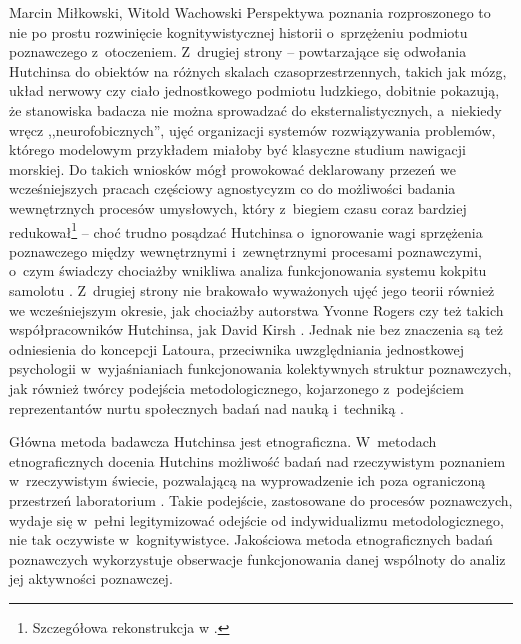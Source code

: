 \begin{artplenv2auth}{Marcin Miłkowski, Witold Wachowski}
Perspektywa poznania rozproszonego to nie po prostu rozwinięcie kognitywistycznej historii o~sprzężeniu podmiotu poznawczego z~otoczeniem. Z~drugiej strony -- powtarzające się odwołania Hutchinsa do obiektów na różnych skalach czasoprzestrzennych, takich jak mózg, układ nerwowy czy ciało jednostkowego podmiotu ludzkiego, dobitnie pokazują, że stanowiska badacza nie można sprowadzać do eksternalistycznych, a~niekiedy wręcz ,,neurofobicznych'', ujęć organizacji systemów rozwiązywania problemów, którego modelowym przykładem miałoby być klasyczne studium nawigacji morskiej. Do takich wniosków mógł prowokować deklarowany przezeń we wcześniejszych pracach częściowy agnostycyzm co do możliwości badania wewnętrznych procesów umysłowych, który z~biegiem czasu coraz bardziej redukował\footnote{Szczegółowa rekonstrukcja w
\parencites[][s.~178–188]{afeltowicz_modele_2012}[][]{afeltowicz_how_2015}.%
} -- choć trudno posądzać Hutchinsa o~ignorowanie wagi sprzężenia poznawczego między wewnętrznymi i~zewnętrznymi procesami poznawczymi, o~czym świadczy chociażby wnikliwa analiza funkcjonowania systemu kokpitu samolotu 
\parencites[zob.][]{hutchins_how_1995}[][]{engestrom_distributed_1996}. %
 Z~drugiej strony nie brakowało wyważonych ujęć jego teorii również we wcześniejszym okresie, jak chociażby autorstwa Yvonne Rogers 
\parencite*[][]{rogers_brief_1997} %
 czy też takich współpracowników Hutchinsa, jak David Kirsh 
\parencite*[][]{kirsh_distributed_1999}. %
 Jednak nie bez znaczenia są też odniesienia do koncepcji Latoura, przeciwnika uwzględniania jednostkowej psychologii w~wyjaśnianiach funkcjonowania kolektywnych struktur poznawczych, jak również twórcy podejścia metodologicznego, kojarzonego z~podejściem reprezentantów nurtu społecznych badań nad nauką i~techniką 
\parencite[zob. np.][]{hess_ethnography_2001}.%


Główna metoda badawcza Hutchinsa jest etnograficzna. W~metodach etnograficznych docenia Hutchins możliwość badań nad rzeczywistym poznaniem w~rzeczywistym świecie, pozwalającą na wyprowadzenie ich poza ograniczoną przestrzeń laboratorium
\parencite[][s.~43]{hutchins_cultural_2014}. %
 Takie podejście, zastosowane do procesów poznawczych, wydaje się w~pełni legitymizować odejście od indywidualizmu metodologicznego, nie tak oczywiste w~kognitywistyce. Jakościowa metoda etnograficznych badań poznawczych wykorzystuje obserwacje funkcjonowania danej wspólnoty do analiz jej aktywności poznawczej.


\end{artplenv2auth}

